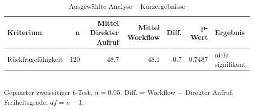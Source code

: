 \begin{table}[htbp]
\centering
\caption{Ausgewählte Analyse -- Kurzergebnisse}
\begin{tabular}{lrrrrrl}
\toprule
Kriterium & n & Mittel Direkter Aufruf & Mittel Workflow & Diff. & p-Wert & Ergebnis \\
\midrule
Rückfragefähigkeit & 120 & 48.7 & 48.1 & -0.7 & 0.7487 & nicht signifikant \\
\bottomrule
\end{tabular}
\\[2mm]
\footnotesize Gepaarter zweiseitiger t-Test, $\alpha=0.05$. Diff. = Workflow $-$ Direkter Aufruf. Freiheitsgrade: $df=n-1$.
\end{table}
